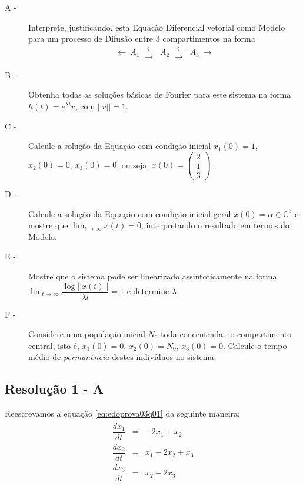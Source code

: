 \begin{description}
\item[A -] Interprete, justificando, esta Equação Diferencial vetorial como Modelo para um processo de Difusão entre 3 compartimentos na forma
\[\longleftarrow\ A_1\ \substack{\ \longleftarrow \\ \longrightarrow\ }\ A_2\ \substack{\ \longleftarrow \\ \longrightarrow\ }\ A_3\ \longrightarrow\]

\item[B -] Obtenha todas as soluções básicas de Fourier para este sistema na forma \(h(t) = e^{\lambda t} v\), com \(||v|| = 1\).

\item[C -] Calcule a solução da Equação com condição inicial
\(x_1(0) = 1\), \(x_2(0) = 0\), \(x_3(0) = 0\), ou seja, \(x(0) = \left(\begin{array}{c} 2 \\ 1 \\ 3\end{array}\right)\).

\item[D -] Calcule a solução da Equação com condição inicial geral
\(x(0) = \alpha \in \mathbb{C}^3\) e mostre que \(\displaystyle\lim_{t \to \infty} x(t) = 0\), interpretando o resultado em termos do Modelo.

\item[E -] Mostre que o sistema pode ser linearizado assintoticamente na forma \(\displaystyle\lim_{t \to \infty} \dfrac{\log||x(t)||}{\lambda t} = 1\) e determine \(\lambda\).

\item[F -] Considere uma população inicial \(N_0\) toda concentrada no compartimento central, isto é, \(x_1(0) = 0\), \(x_2(0) = N_0\), \(x_3(0) = 0\). Calcule o tempo médio de \textit{permanência} destes indivíduos no sistema.
\end{description}


\clearpage

\subsection*{\blue Resolução 1 - \textbf{A}}

Reescrevamos a equação \eqref{eq:edoprova03q01} da seguinte maneira:
\begin{eqnarray}\label{eq:edoprova03q01a}
\begin{array}{rcl}
\dfrac{dx_1}{dt} &=& -2x_1 + x_2 \\[0.5cm]
\dfrac{dx_2}{dt} &=& x_1 - 2x_2 + x_3 \\[0.5cm]
\dfrac{dx_3}{dt} &=& x_2 - 2 x_3
\end{array}
\end{eqnarray}

